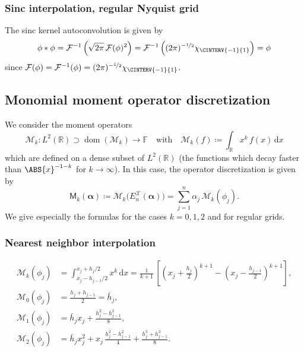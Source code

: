 \documentclass[a4paper]{paper}
\newcommand*{\SPC}[1]{{\ensuremath{\mathscr{#1}}}}
\newcommand*{\FIELD}{{\ensuremath{\mathbb{F}}}}
\newcommand{\RR}{{\ensuremath{\mathbb{R}}}}
\newcommand*{\OP}[1]{{\ensuremath{\mathcal{#1}}}}
\newcommand*{\OPM}{\OP{M}}
\newcommand{\DISCOP}[1]{{\ensuremath{\mathsf{#1}}}}
\newcommand*{\EXT}[2]{\ensuremath{E_{#1}^{#2}}}
\newcommand*{\EnX}{{\ensuremath{\EXT{n}{\SPC{X}}}}}
\newcommand*{\FT}{\OP{F}}
\DeclareMathOperator{\DOMAIN}{{dom}}
\DeclareMathOperator{\DEFEQ}{{\coloneqq}}
\newcommand*{\D}{{\ensuremath{\mathrm{d}}}}
\newcommand*{\BDalpha}{\boldsymbol{\alpha}}
\begin{document}
\subsubsection{Sinc interpolation, regular Nyquist grid}
\label{subsubsec:specif:conv:sinc}

The sinc kernel autoconvolution is given by
%
\begin{equation*}
 \phi \ast \phi = \FT^{-1}\left( \sqrt{2\pi}\, \FT(\phi)^2 \right) 
 = \FT^{-1}\left( (2\pi)^{-\nicefrac{1}{2}} \chi_{\CINTERV{-1}{1}} \right) = \phi
\end{equation*}
%
since $\FT(\phi) = \FT^{-1}(\phi) = (2\pi)^{-\nicefrac{1}{2}} \chi_{\CINTERV{-1}{1}}$.



\subsection{Monomial moment operator discretization}
\label{subsec:specif:moments}

We consider the moment operators
%
\begin{equation*}
 \OPM_k \colon L^2(\RR) \supset \DOMAIN(\OPM_k) \to \FIELD
 \quad\text{with}\quad
 \OPM_k(f) \DEFEQ \int_\RR x^k\, f(x)\, \D x
\end{equation*}
%
which are defined on a dense subset of $L^2(\RR)$ (the functions which decay faster than $\ABS{x}^{-1-k}$ for 
$k \to \infty$). In this case, the operator discretization is given by
%
\begin{equation*}
 \DISCOP{M}_k(\BDalpha) \DEFEQ \OPM_k\big( \EnX(\BDalpha) \big) = \sum_{j=1}^n \alpha_j\, \OPM_k(\phi_j).
\end{equation*}
%
We give especially the formulas for the cases $k=0,1,2$ and for regular grids.


\subsubsection{Nearest neighbor interpolation}
\label{subsubsec:specif:moments:nn}

\begin{align*}
 \OPM_k(\phi_j) 
 &= \int_{x_j-h_{j-1}/2}^{x_j+h_j/2} x^k\, \D x 
 = \frac{1}{k+1}\, \left[ \left(x_j + \frac{h_j}{2}\right)^{k+1} - \left(x_j - \frac{h_{j-1}}{2}\right)^{k+1} \right], 
 \\
 \OPM_0(\phi_j) &= \frac{h_j + h_{j-1}}{2} = \bar h_j, \\
 \OPM_1(\phi_j) &= \bar h_j x_j + \frac{h_j^2 - h_{j-1}^2}{8}, \\
 \OPM_2(\phi_j) &= \bar h_j x_j^2 + x_j\, \frac{h_j^2 - h_{j-1}^2}{4} +  \frac{h_j^3 + h_{j-1}^3}{8}.
\end{align*}
\end{document}
